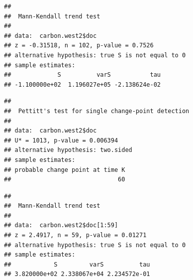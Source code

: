\documentclass[12pt,]{article}
\newenvironment{Shaded}{\begin{snugshade}}{\end{snugshade}}
\newcommand{\KeywordTok}[1]{\textcolor[rgb]{0.13,0.29,0.53}{\textbf{#1}}}
\newcommand{\DecValTok}[1]{\textcolor[rgb]{0.00,0.00,0.81}{#1}}
\newcommand{\CommentTok}[1]{\textcolor[rgb]{0.56,0.35,0.01}{\textit{#1}}}
\newcommand{\OperatorTok}[1]{\textcolor[rgb]{0.81,0.36,0.00}{\textbf{#1}}}
\newcommand{\NormalTok}[1]{#1}
\begin{document}
\begin{Shaded}
\end{Shaded}

\begin{verbatim}
## 
##  Mann-Kendall trend test
## 
## data:  carbon.west2$doc
## z = -0.31518, n = 102, p-value = 0.7526
## alternative hypothesis: true S is not equal to 0
## sample estimates:
##             S          varS           tau 
## -1.100000e+02  1.196027e+05 -2.138624e-02
\end{verbatim}

\begin{Shaded}
\end{Shaded}

\begin{verbatim}
## 
##  Pettitt's test for single change-point detection
## 
## data:  carbon.west2$doc
## U* = 1013, p-value = 0.006394
## alternative hypothesis: two.sided
## sample estimates:
## probable change point at time K 
##                              60
\end{verbatim}

\begin{Shaded}
\end{Shaded}

\begin{verbatim}
## 
##  Mann-Kendall trend test
## 
## data:  carbon.west2$doc[1:59]
## z = 2.4917, n = 59, p-value = 0.01271
## alternative hypothesis: true S is not equal to 0
## sample estimates:
##            S         varS          tau 
## 3.820000e+02 2.338067e+04 2.234572e-01
\end{verbatim}

\begin{Shaded}
\end{Shaded}
\end{document}
